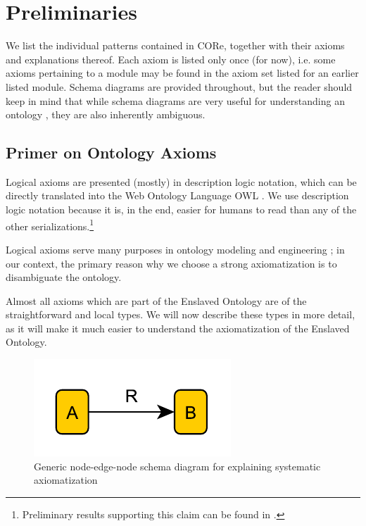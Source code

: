 \chapter{Preliminaries}
\label{chap:prelims}
We list the individual patterns contained in CORe, together with their axioms and explanations thereof. Each axiom is listed only once (for now), i.e. some axioms pertaining to a module may be found in the axiom set listed for an earlier listed module. Schema diagrams are provided throughout, but the reader should keep in mind that while schema diagrams are very useful for understanding an ontology \cite{odp-documentation}, they are also inherently ambiguous.

\section*{Primer on Ontology Axioms}

Logical axioms are presented (mostly) in description logic notation, which can be directly translated into the Web Ontology Language OWL \cite{FOST}. We use description logic notation because it is, in the end, easier for humans to read than any of the other serializations.\footnote{Preliminary results supporting this claim can be found in \cite{ShimizuMS}.} 

Logical axioms serve many purposes in ontology modeling and engineering \cite{HitzlerK16};  in our context, the primary reason why we choose a strong axiomatization is to disambiguate the ontology.

Almost all axioms which are part of the Enslaved Ontology are of the straightforward and local types. We will now describe these types in more detail, as it will make it much easier to understand the axiomatization of the Enslaved Ontology.

\bigskip

\begin{figure}[tb]
\begin{center}
\includegraphics[width=.3\textwidth]{figures/02-ARB}
\caption{Generic node-edge-node schema diagram for explaining systematic axiomatization}\label{fig:rec-ARB}
\end{center}
\end{figure}

